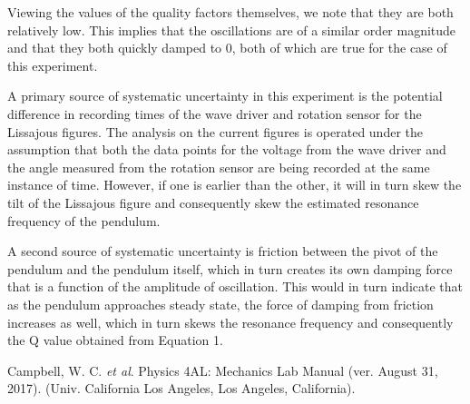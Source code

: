 \documentclass[twoside,twocolumn]{article}
\begin{document}
\hfill

\noindent Viewing the values of the quality factors themselves, we note that they are both relatively low. This implies that the oscillations are of a similar order magnitude and that they both quickly damped to 0, both of which are true for the case of this experiment.

\hfill

\noindent A primary source of systematic uncertainty in this experiment is the potential difference in recording times of the wave driver and rotation sensor for the Lissajous figures. The analysis on the current figures is operated under the assumption that both the data points for the voltage from the wave driver and the angle measured from the rotation sensor are being recorded at the same instance of time. However, if one is earlier than the other, it will in turn skew the tilt of the Lissajous figure and consequently skew the estimated resonance frequency of the pendulum.

\hfill

\noindent A second source of systematic uncertainty is friction between the pivot of the pendulum and the pendulum itself, which in turn creates its own damping force that is a function of the amplitude of oscillation. This would in turn indicate that as the pendulum approaches steady state, the force of damping from friction increases as well, which in turn skews the resonance frequency and consequently the Q value obtained from Equation 1.



\begin{thebibliography}{99} %

Campbell, W. C. \textit{et al}. Physics 4AL: Mechanics Lab Manual (ver. August 31, 2017).
(Univ. California Los Angeles, Los Angeles, California).

\end{thebibliography}

\end{document}
